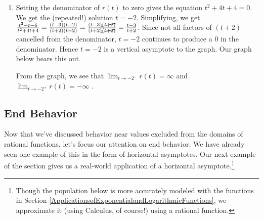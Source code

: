 \documentclass{ximera}
\begin{document}
\begin{example}
\begin{explanation}
\begin{enumerate}
\begin{center}
\end{center} 

\item  Setting the denominator of $r(t)$ to zero gives the equation $t^2+4t+4 = 0$.  We get  the (repeated!) solution $t=-2$.  Simplifying, we get  $\frac{t^2-t-6}{t^2+4t+4} = \frac{(t-3)(t+2)}{(t+2)(t+2)}  =  \frac{(t-3)\cancel{(t+2)}}{(t+2)\cancel{(t+2)}} =  \frac{t-3}{t+2}$.  Since  not all factors of $(t+2)$ cancelled from the denominator, $t=-2$ continues to produce a $0$ in the denominator.  Hence $t=-2$ is a vertical asymptote to the graph. Our graph below bears this out. 


\begin{center}
\end{center} 

From the graph, we see that  $\lim_{t \rightarrow -2^{-}} r(t) = \infty$ and  $\lim_{t \rightarrow -2^{+}} r(t) = -\infty$ .

\end{enumerate}
\end{explanation}
\end{example}

\subsection{End Behavior}
\label{ebrationalsection}

Now that we've  discussed behavior near values excluded from the domains of rational functions, let's focus our attention on  end behavior.  We have already seen one example of this in the form of horizontal asymptotes.  Our next example of the section gives us a real-world application of a horizontal asymptote.\footnote{Though the population below is more accurately modeled with the functions in Section \ref{ApplicationsofExponentialandLogarithmicFunctions}, we approximate it (using Calculus, of course!) using a rational function.}
\end{document}
